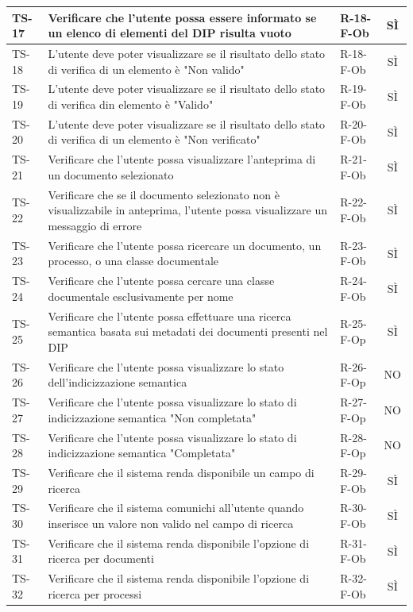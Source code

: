 \documentclass[a4paper,12pt]{article}
\begin{document}
\begin{longtable}{|p{1.5cm}|p{8.3cm}|p{2.4cm}|c|}
\hline
TS-17 & Verificare che l'utente possa essere informato se un elenco di elementi del DIP risulta vuoto & R-18-F-Ob & SÌ \\
\hline
TS-18 & L'utente deve poter visualizzare se il risultato dello stato di verifica di un elemento è "Non valido" & R-18-F-Ob & SÌ \\
\hline
TS-19 & L'utente deve poter visualizzare se il risultato dello stato di verifica din elemento è "Valido" & R-19-F-Ob & SÌ \\ 
\hline
TS-20 & L'utente deve poter visualizzare se il risultato dello stato di verifica di un elemento è "Non verificato" & R-20-F-Ob & SÌ \\
\hline
TS-21 & Verificare che l'utente possa visualizzare l'anteprima di un documento selezionato & R-21-F-Ob & SÌ \\
\hline
TS-22 & Verificare che se il documento selezionato non è visualizzabile in anteprima, l'utente possa visualizzare un messaggio di errore & R-22-F-Ob & SÌ \\
\hline
TS-23 & Verificare che l'utente possa ricercare un documento, un processo, o una classe documentale & R-23-F-Ob & SÌ \\
\hline
TS-24 & Verificare che l'utente possa cercare una classe documentale esclusivamente per nome & R-24-F-Ob & SÌ \\
\hline
TS-25 & Verificare che l'utente possa effettuare una ricerca semantica basata sui metadati dei documenti presenti nel DIP & R-25-F-Op & SÌ \\
\hline
TS-26 & Verificare che l'utente possa visualizzare lo stato dell'indicizzazione semantica & R-26-F-Op & NO \\
\hline
TS-27 & Verificare che l'utente possa visualizzare lo stato di indicizzazione semantica "Non completata" & R-27-F-Op & NO \\
\hline
TS-28 & Verificare che l'utente possa visualizzare lo stato di indicizzazione semantica "Completata" & R-28-F-Op & NO \\
\hline
TS-29 & Verificare che il sistema renda disponibile un campo di ricerca & R-29-F-Ob & SÌ \\
\hline
TS-30 & Verificare che il sistema comunichi all'utente quando inserisce un valore non valido nel campo di ricerca & R-30-F-Ob & SÌ \\
\hline
TS-31 & Verificare che il sistema renda disponibile l'opzione di ricerca per documenti & R-31-F-Ob & SÌ \\
\hline
TS-32 & Verificare che il sistema renda disponibile l'opzione di ricerca per processi & R-32-F-Ob & SÌ \\

\end{longtable}
\end{document}
